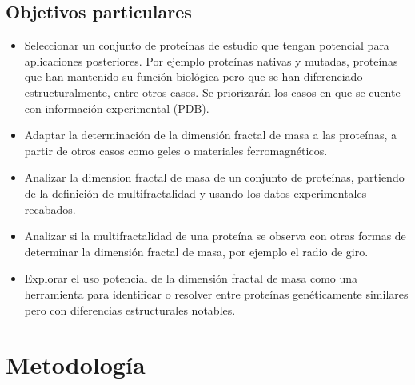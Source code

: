 \documentclass[11pt]{article}
\begin{document}
\subsection{Objetivos particulares}

\begin{itemize}

\item Seleccionar un conjunto de prote\'{i}nas de estudio que tengan potencial para aplicaciones posteriores.
Por ejemplo prote\'{i}nas nativas y mutadas, prote\'{i}nas que han mantenido su funci\'{o}n biol\'{o}gica pero que se
han diferenciado estructuralmente, entre otros casos. Se priorizar\'{a}n los casos en que se cuente con informaci\'{o}n
experimental (PDB).

\item Adaptar la determinaci\'{o}n de la dimensi\'{o}n fractal de masa a las prote\'{i}nas, a partir de otros casos como geles o materiales ferromagn\'{e}ticos.

\item Analizar la dimension fractal de masa de un conjunto de prote\'{i}nas, partiendo de la definici\'{o}n de multifractalidad y usando los datos experimentales recabados.

\item Analizar si la multifractalidad de una prote\'{i}na se observa con otras formas de determinar la
dimensi\'{o}n fractal de masa, por ejemplo el radio de giro.

\item Explorar el uso potencial de la dimensi\'{o}n fractal de masa como una herramienta para identificar
o resolver entre prote\'{i}nas gen\'{e}ticamente similares pero con diferencias estructurales notables.

\end{itemize}

\clearpage

\section{Metodolog\'{i}a}
\end{document}
